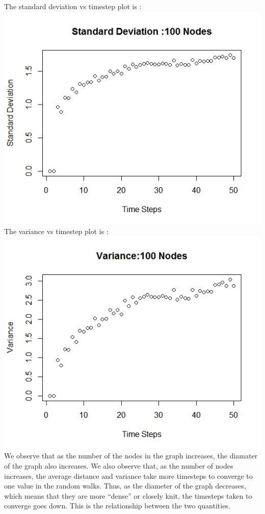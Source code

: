 \documentclass{article}
\begin{document}
The standard deviation vs timestep plot is :\\
\includegraphics[scale=0.4]{p2f} \\
The variance vs timestep plot is :\\
\includegraphics[scale=0.4]{p2e} \\
We observe that as the number of the nodes in the graph increases, the diamater of the graph also increases.
We also observe that, as the number of nodes increases, the average distance and variance take more timesteps to 
converge to one value in the random walks. Thus, as the diameter of the graph decreases, which means that they are 
more ``dense'' or closely knit, the timesteps taken to converge goes down. This is the relationship between the two
quantities.
\end{document}
